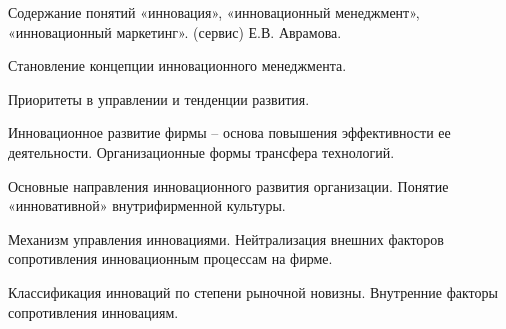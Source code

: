 \documentclass[
	14pt,
	a4paper,
	]
	{scrartcl}
\begin{document}
\shapk
{}
\setcounter{zad}{0}

\vfill
\z Содержание понятий «инновация», «инновационный менеджмент», «инновационный маркетинг».
 \vfill
\z (сервис) Е.В. Аврамова. \vfill

\vfill

\newpage


\shapk
{}
\setcounter{zad}{0}

\vfill
\z Становление концепции инновационного менеджмента.
 \vfill
\z 
 \vfill

\vfill

\newpage


\shapk
{}
\setcounter{zad}{0}

\vfill
\z Приоритеты в управлении и тенденции развития.
 \vfill
\z 
 \vfill

\vfill

\newpage


\shapk
{}
\setcounter{zad}{0}

\vfill
\z Инновационное развитие фирмы – основа повышения эффективности ее деятельности.
 \vfill
\z Организационные формы трансфера технологий.
 \vfill

\vfill

\newpage


\shapk
{}
\setcounter{zad}{0}

\vfill
\z Основные направления инновационного развития организации.
 \vfill
\z Понятие «инновативной» внутрифирменной культуры.
 \vfill

\vfill

\newpage


\shapk
{}
\setcounter{zad}{0}

\vfill
\z Механизм управления инновациями.
 \vfill
\z Нейтрализация внешних факторов сопротивления инновационным процессам на фирме.
 \vfill

\vfill

\newpage


\shapk
{}
\setcounter{zad}{0}

\vfill
\z Классификация инноваций по степени рыночной новизны.
 \vfill
\z Внутренние факторы сопротивления инновациям.
 \vfill

\vfill

\newpage


\shapk
{}
\setcounter{zad}{0}
\end{document}
